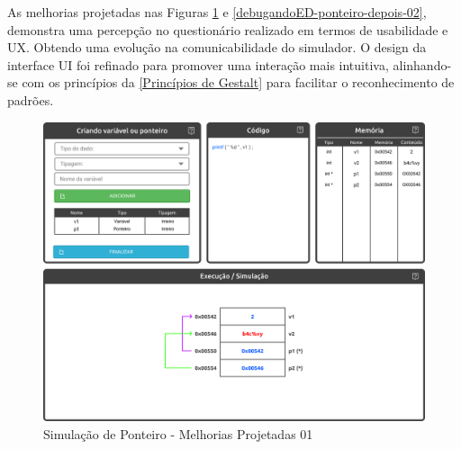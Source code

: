 As melhorias projetadas nas Figuras \ref{debugandoED-ponteiro-depois-01} e \ref{debugandoED-ponteiro-depois-02}, demonstra uma percepção no questionário realizado em termos de usabilidade e \ac{UX}. Obtendo uma evolução na comunicabilidade do simulador. O design da interface \ac{UI} foi refinado para promover uma interação mais intuitiva, alinhando-se com os princípios da \autoref{Princípios de Gestalt} para facilitar o reconhecimento de padrões.

\begin{figure}[htb]
    \begin{center}
        \includegraphics[scale=0.25]{figs/debugandoED-ponteiro-depois-01.png}
    \end{center}
    \caption{\label{debugandoED-ponteiro-depois-01}Simulação de Ponteiro - Melhorias Projetadas 01}
\end{figure}

